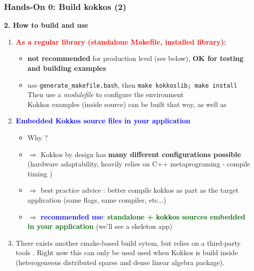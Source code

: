 \begin{frame}
  \frametitle{Hands-On 0: Build kokkos (2)}

  \textbf{2. How to build and use}
  \begin{enumerate}
  \item \textcolor{red}{\textbf{As a regular library (standalone Makefile, installed library):}} \\
    \begin{itemize}
    \item {\bf not recommended} for production level (see below), {\bf OK for testing and building examples}
    \item use \texttt{generate\_makefile.bash}, then \texttt{make kokkoslib; make install}\\
      Then use a \textit{modulefile} to configure the environment\\
      Kokkos examples (inside source) can be built that way, as well as 
    \end{itemize}
  \item \textcolor{blue}{\textbf{Embedded Kokkos source files in your application}}
    \begin{itemize}
    \item Why ?
    \item $\Rightarrow$ Kokkos by design has {\bf many different configurations possible} (hardware adaptability, heavily relies on C++ metaprograming - compile timing )
    \item $\Rightarrow$ best practice advice : better compile kokkos as part as the target application (same flags, same compiler, etc...)
    \item $\Rightarrow$ \textcolor{blue}{\bf recommended use}:
    \textcolor{darkgreen}{\bf standalone  + kokkos sources embedded in your application} (we'll see a skeleton app)
    \end{itemize}
  \item There exists another cmake-based build sytem, but relies on a third-party tools . Right now this can only be used used when Kokkos is build inside  (heterogeneous distributed sparse and dense linear algebra package).
  \end{enumerate}
 
\end{frame}

